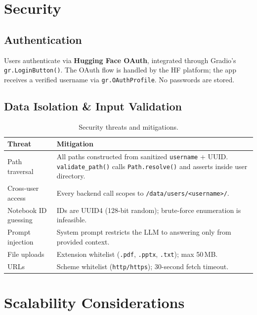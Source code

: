 \documentclass[11pt, letterpaper]{article}
\begin{document}
\section{Security}

\subsection{Authentication}

Users authenticate via \textbf{Hugging Face OAuth}, integrated through Gradio's
\texttt{gr.LoginButton()}.  The OAuth flow is handled by the HF platform; the
app receives a verified username via \texttt{gr.OAuthProfile}.  No passwords
are stored.

\subsection{Data Isolation \& Input Validation}

\begin{table}[H]
\centering\small
\begin{tabularx}{\textwidth}{@{}l X@{}}
\toprule
\textbf{Threat} & \textbf{Mitigation} \\
\midrule
Path traversal &
    All paths constructed from sanitized \texttt{username} + UUID.
    \texttt{validate\_path()} calls \texttt{Path.resolve()} and asserts inside user directory. \\
\addlinespace
Cross-user access &
    Every backend call scopes to \texttt{/data/users/<username>/}. \\
\addlinespace
Notebook ID guessing &
    IDs are UUID4 (128-bit random); brute-force enumeration is infeasible. \\
\addlinespace
Prompt injection &
    System prompt restricts the LLM to answering only from provided context. \\
\addlinespace
File uploads &
    Extension whitelist (\texttt{.pdf}, \texttt{.pptx}, \texttt{.txt}); max 50\,MB. \\
\addlinespace
URLs &
    Scheme whitelist (\texttt{http/https}); 30-second fetch timeout. \\
\bottomrule
\end{tabularx}
\caption{Security threats and mitigations.}
\end{table}

\section{Scalability Considerations}
\end{document}
